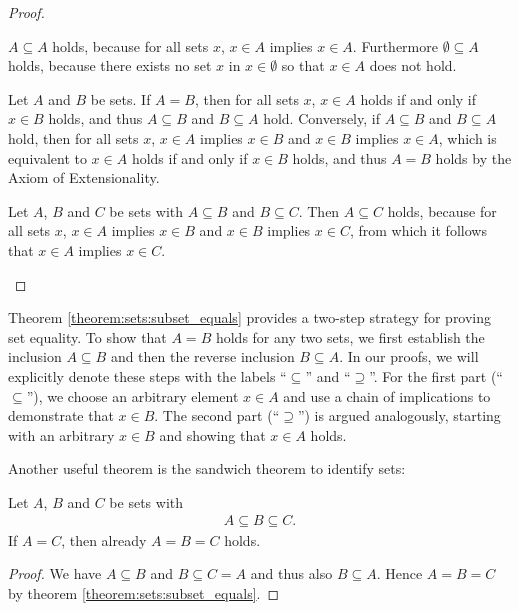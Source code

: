 \begin{proof}
    \begin{proofenumerate}
        \item $A\subseteq A$ holds, because for all sets $x$, $x\in A$ implies $x\in A$. Furthermore $\emptyset\subseteq A$ holds, because there exists no set $x$ in $x\in\emptyset$ so that $x\in A$ does not hold.
        \item Let $A$ and $B$ be sets. If $A=B$, then for all sets $x$, $x\in A$ holds if and only if $x\in B$ holds, and thus $A\subseteq B$ and $B\subseteq A$ hold. Conversely, if $A\subseteq B$ and $B\subseteq A$ hold, then for all sets $x$, $x\in A$ implies $x\in B$ and $x\in B$ implies $x\in A$, which is equivalent to $x\in A$ holds if and only if $x\in B$ holds, and thus $A=B$ holds by the Axiom of Extensionality.
        \item Let $A$, $B$ and $C$ be sets with $A\subseteq B$ and $B\subseteq C$. Then $A\subseteq C$ holds, because for all sets $x$, $x\in A$ implies $x\in B$ and $x\in B$ implies $x\in C$, from which it follows that $x\in A$ implies $x\in C$.
    \end{proofenumerate}
\end{proof}

Theorem \ref{theorem:sets:subset_equals} provides a two-step strategy for proving set equality. To show that $A = B$ holds for any two sets, we first establish the inclusion $A \subseteq B$ and then the reverse inclusion $B \subseteq A$. In our proofs, we will explicitly denote these steps with the labels \enquote{$\subseteq$} and \enquote{$\supseteq$}. For the first part (\enquote{$\subseteq$}), we choose an arbitrary element $x \in A$ and use a chain of implications to demonstrate that $x \in B$. The second part (\enquote{$\supseteq$}) is argued analogously, starting with an arbitrary $x \in B$ and showing that $x \in A$ holds.

Another useful theorem is the sandwich theorem to identify sets:
\begin{theorem}\label{theorem:sets:sandwich_theorem}
    Let $A$, $B$ and $C$ be sets with \begin{align}A\subseteq B\subseteq C.\end{align} If $A=C$, then already $A=B=C$ holds.
\end{theorem}
\begin{proof}
    We have $A\subseteq B$ and $B\subseteq C=A$ and thus also $B\subseteq A$. Hence $A=B=C$ by theorem \ref{theorem:sets:subset_equals}.
\end{proof}

